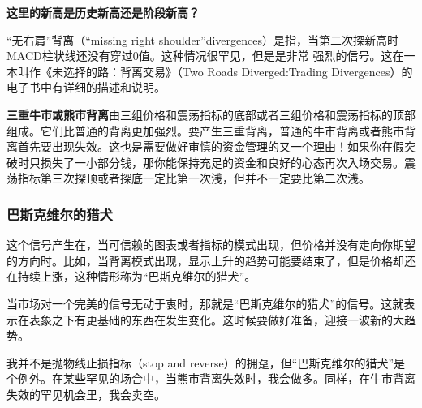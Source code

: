\textbf{这里的新高是历史新高还是阶段新高？}

“无右肩”背离（“missing right shoulder”divergences）是指，当第二次探新高时MACD柱状线还没有穿过0值。这种情况很罕见，但是是非常
强烈的信号。这在一本叫作《未选择的路：背离交易》（Two Roads Diverged:Trading Divergences）的电子书中有详细的描述和说明。

\textbf{三重牛市或熊市背离}由三组价格和震荡指标的底部或者三组价格和震荡指标的顶部组成。它们比普通的背离更加强烈。要产生三重背离，普通的牛市背离或者熊市背离首先要出现失效。这也是需要做好审慎的资金管理的又一个理由！如果你在假突破时只损失了一小部分钱，那你能保持充足的资金和良好的心态再次入场交易。震荡指标第三次探顶或者探底一定比第一次浅，但并不一定要比第二次浅。
\subsubsection*{巴斯克维尔的猎犬}
这个信号产生在，当可信赖的图表或者指标的模式出现，但价格并没有走向你期望的方向时。比如，当背离模式出现，显示上升的趋势可能要结束了，但是价格却还在持续上涨，这种情形称为“巴斯克维尔的猎犬”。

当市场对一个完美的信号无动于衷时，那就是“巴斯克维尔的猎犬”的信号。这就表示在表象之下有更基础的东西在发生变化。这时候要做好准备，迎接一波新的大趋势。

我并不是抛物线止损指标（stop and reverse）的拥趸，但“巴斯克维尔的猎犬”是个例外。在某些罕见的场合中，当熊市背离失效时，我会做多。同样，在牛市背离失效的罕见机会里，我会卖空。